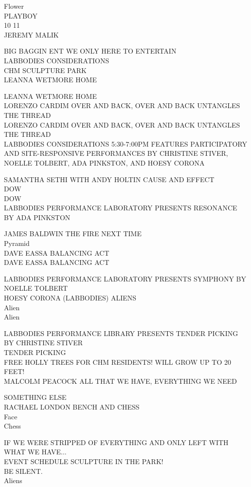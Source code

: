 \documentclass[10pt,letterpaper]{article}
\begin{document}
Flower\\
PLAYBOY\\
10 11\\
JEREMY MALIK

BIG BAGGIN ENT WE ONLY HERE TO ENTERTAIN\\
LABBODIES CONSIDERATIONS\\
CHM SCULPTURE PARK\\
LEANNA WETMORE HOME

LEANNA WETMORE HOME\\
LORENZO CARDIM OVER AND BACK, OVER AND BACK UNTANGLES THE THREAD\\
LORENZO CARDIM OVER AND BACK, OVER AND BACK UNTANGLES THE THREAD\\
LABBODIES CONSIDERATIONS 5:30{-}7:00PM FEATURES PARTICIPATORY AND SITE{-}RESPONSIVE PERFORMANCES BY CHRISTINE STIVER, NOELLE TOLBERT, ADA PINKSTON, AND HOESY CORONA

SAMANTHA SETHI WITH ANDY HOLTIN CAUSE AND EFFECT\\
DOW\\
DOW\\
LABBODIES PERFORMANCE LABORATORY PRESENTS RESONANCE BY ADA PINKSTON

JAMES BALDWIN THE FIRE NEXT TIME\\
Pyramid\\
DAVE EASSA BALANCING ACT\\
DAVE EASSA BALANCING ACT

LABBODIES PERFORMANCE LABORATORY PRESENTS SYMPHONY BY NOELLE TOLBERT\\
HOESY CORONA (LABBODIES) ALIENS\\
Alien\\
Alien

LABBODIES PERFORMANCE LIBRARY PRESENTS TENDER PICKING BY CHRISTINE STIVER\\
TENDER PICKING\\
FREE HOLLY TREES FOR CHM RESIDENTS!  WILL GROW UP TO 20 FEET!\\
MALCOLM PEACOCK ALL THAT WE HAVE, EVERYTHING WE NEED

SOMETHING ELSE\\
RACHAEL LONDON BENCH AND CHESS\\
Face\\
Chess

IF WE WERE STRIPPED OF EVERYTHING AND ONLY LEFT WITH WHAT WE HAVE...\\
EVENT SCHEDULE SCULPTURE IN THE PARK!\\
BE SILENT.\\
Aliens
\end{document}
